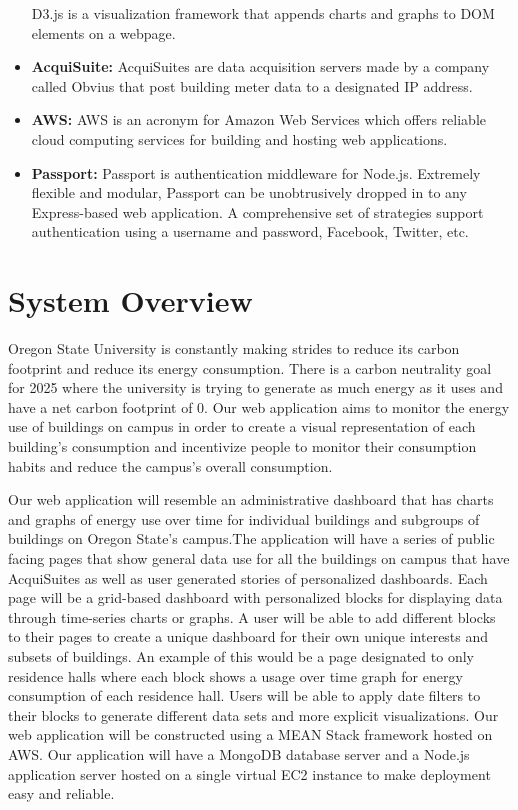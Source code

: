 \documentclass[journal,10pt,onecolumn,compsoc]{IEEEtran}
\begin{document}
\begin{itemize}
            D3.js is a visualization framework that appends charts and graphs to DOM elements on a webpage. 
        \item \textbf{AcquiSuite:} 
            AcquiSuites are data acquisition servers made by a company called Obvius that post building meter data to a designated IP address.
        \item \textbf{AWS:} 
            AWS is an acronym for Amazon Web Services which offers reliable cloud computing services for building and hosting web applications.
	   \item \textbf{Passport:} 
			Passport is authentication middleware for Node.js. Extremely flexible and modular, Passport can be unobtrusively dropped in to any Express-based web application. A comprehensive set of strategies support authentication using a username and password, Facebook, Twitter, etc.
   \end{itemize}
    \section{System Overview} 
    Oregon State University is constantly making strides to reduce its carbon footprint and reduce its energy consumption. There is a carbon neutrality goal for 2025 where the university is trying to generate as much energy as it uses and have a net carbon footprint of 0. Our web application aims to monitor the energy use of buildings on campus in order to create a visual representation of each building's consumption and incentivize people to monitor their consumption habits and reduce the campus's overall consumption.

    \noindent Our web application will resemble an administrative dashboard that has charts and graphs of energy use over time for individual buildings and subgroups of buildings on Oregon State's campus.The application will have a series of public facing pages that show general data use for all the buildings on campus that have AcquiSuites as well as user generated stories of personalized dashboards. Each page will be a grid-based dashboard with personalized blocks for displaying data through time-series charts or graphs. A user will be able to add different blocks to their pages to create a unique dashboard for their own unique interests and subsets of buildings. An example of this would be a page designated to only residence halls where each block shows a usage over time graph for energy consumption of each residence hall. Users will be able to apply date filters to their blocks to generate different data sets and more explicit visualizations. 
    \noindent Our web application will be constructed using a MEAN Stack framework hosted on AWS. Our application will have a MongoDB database server and a Node.js application server hosted on a single virtual EC2 instance to make deployment easy and reliable.
\end{document}
